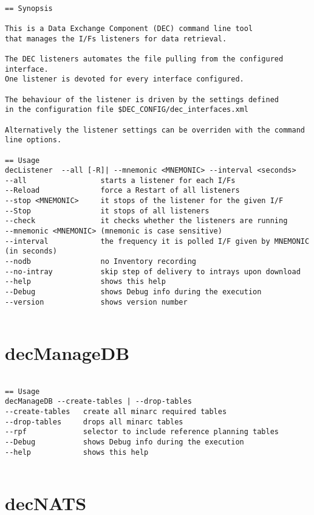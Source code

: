 \documentclass[dec_sum_main.tex]{subfiles}
\begin{document}
\begin{verbatim}

== Synopsis

This is a Data Exchange Component (DEC) command line tool 
that manages the I/Fs listeners for data retrieval.

The DEC listeners automates the file pulling from the configured interface.
One listener is devoted for every interface configured.

The behaviour of the listener is driven by the settings defined
in the configuration file $DEC_CONFIG/dec_interfaces.xml

Alternatively the listener settings can be overriden with the command line options.

== Usage
decListener  --all [-R]| --mnemonic <MNEMONIC> --interval <seconds>
--all                 starts a listener for each I/Fs
--Reload              force a Restart of all listeners
--stop <MNEMONIC>     it stops of the listener for the given I/F
--Stop                it stops of all listeners
--check               it checks whether the listeners are running
--mnemonic <MNEMONIC> (mnemonic is case sensitive)
--interval            the frequency it is polled I/F given by MNEMONIC (in seconds)
--nodb                no Inventory recording
--no-intray           skip step of delivery to intrays upon download
--help                shows this help
--Debug               shows Debug info during the execution
--version             shows version number      


\end{verbatim}

\label{decManageDB}

\section{decManageDB}

\begin{verbatim}

== Usage
decManageDB --create-tables | --drop-tables
--create-tables   create all minarc required tables
--drop-tables     drops all minarc tables
--rpf             selector to include reference planning tables
--Debug           shows Debug info during the execution
--help            shows this help


\end{verbatim}

\label{decNATS}

\section{decNATS}
\end{document}

